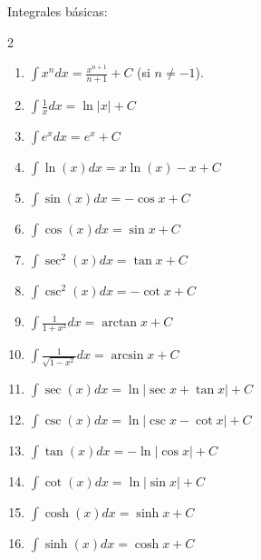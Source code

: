 \documentclass{article}
\begin{document}
{\large Integrales básicas:}
\begin{multicols}{2}
  \begin{enumerate}
    \item $\displaystyle\int x^n dx = \frac{x^{n+1}}{n+1}+C$ (si $n\neq -1$).
    \item $\displaystyle\int \frac{1}{x}dx = \ln|x|+C$
    \item $\displaystyle\int e^x dx = e^x+C$
    \item $\displaystyle\int \ln(x) dx = x\ln(x)-x+C$
    \item $\displaystyle\int \sin(x) dx = -\cos x+C$
    \item $\displaystyle\int \cos(x) dx = \sin x+C$
    \item $\displaystyle\int \sec^2(x) dx = \tan x+C$
    \item $\displaystyle\int \csc^2(x) dx = -\cot x+C$
    \item $\displaystyle\int \frac{1}{1+x^2}dx = \arctan x+C$
    \item $\displaystyle\int \frac{1}{\sqrt{1-x^2}}dx = \arcsin x+C$
    \item $\displaystyle\int \sec(x) dx = \ln|\sec x+\tan x|+C$
    \item $\displaystyle\int \csc(x) dx = \ln|\csc x-\cot x|+C$
    \item $\displaystyle\int \tan(x) dx = -\ln|\cos x|+C$
    \item $\displaystyle\int \cot(x) dx = \ln|\sin x|+C$
    \item $\displaystyle\int \cosh(x) dx = \sinh x+C$
    \item $\displaystyle\int \sinh(x) dx = \cosh x+C$
  \end{enumerate}
\end{multicols}
\vspace{2mm}
\end{document}

